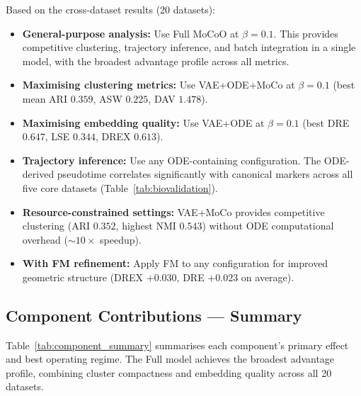 \documentclass[preprint,12pt,number]{elsarticle}
\begin{document}
Based on the cross-dataset results (20 datasets):
\begin{itemize}
    \item \textbf{General-purpose analysis:} Use Full MoCoO at $\beta{=}0.1$. This provides competitive clustering, trajectory inference, and batch integration in a single model, with the broadest advantage profile across all metrics.
    \item \textbf{Maximising clustering metrics:} Use VAE+ODE+MoCo at $\beta{=}0.1$ (best mean ARI $0.359$, ASW $0.225$, DAV $1.478$).
    \item \textbf{Maximising embedding quality:} Use VAE+ODE at $\beta{=}0.1$ (best DRE $0.647$, LSE $0.344$, DREX $0.613$).
    \item \textbf{Trajectory inference:} Use any ODE-containing configuration. The ODE-derived pseudotime correlates significantly with canonical markers across all five core datasets (Table~\ref{tab:biovalidation}).
    \item \textbf{Resource-constrained settings:} VAE+MoCo provides competitive clustering (ARI $0.352$, highest NMI $0.543$) without ODE computational overhead (${\sim}10\times$ speedup).
    \item \textbf{With FM refinement:} Apply FM to any configuration for improved geometric structure (DREX $+0.030$, DRE $+0.023$ on average).
\end{itemize}

\subsection{Component Contributions --- Summary}
\label{sec:discussion:summary}

Table~\ref{tab:component_summary} summarises each component's primary effect and best operating regime. The Full model achieves the broadest advantage profile, combining cluster compactness and embedding quality across all 20 datasets.

\begin{table}[!t]
    \centering
    \caption{Component contributions summary.}
    \label{tab:component_summary}
\end{table}
\end{document}
